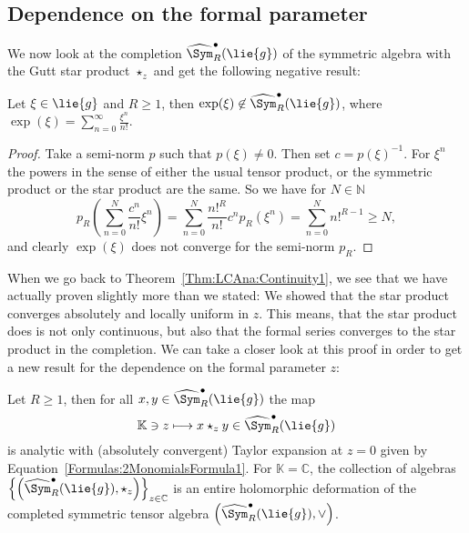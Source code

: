 \subsection{Dependence on the formal parameter}

We now look at the completion $\widehat{\Sym}_R^{\bullet}(\lie{g})$ of
the symmetric algebra with the Gutt star product $\star_z$ and 
get the following negative result:
\begin{proposition}
    \label{proposition:NoExponentialsSorry}%
    Let $\xi \in \lie{g}$ and $R \geq 1$, then $\exp(\xi) \not\in
    \widehat{\Sym}_R^{\bullet}(\lie{g})$, where $\exp(\xi) =
    \sum_{n=0}^{\infty} \frac{\xi^n}{n!}$.
\end{proposition}
\begin{proof}
    Take a semi-norm $p$ such that $p(\xi) \neq 0$. Then set $c =
    p(\xi)^{-1}$. For $\xi^n$ the powers in the sense of either the
    usual tensor product, or the symmetric product or the star product
    are the same. So we have for $N \in \mathbb{N}$
    \begin{equation*}
        p_R \left(
        \sum\limits_{n=0}^N
        \frac{c^n}{n!} \xi^n
        \right)
        =
        \sum\limits_{n=0}^N
        \frac{n!^R}{n!}
        c^n
        p_R \left( \xi^n
        \right)
        =
        \sum\limits_{n=0}^N
        n!^{R - 1}
        \geq
        N,
    \end{equation*}
    and clearly $\exp(\xi)$ does not converge for the semi-norm $p_R$.
\end{proof}
When we go back to Theorem~\ref{Thm:LCAna:Continuity1}, we see that we have 
actually proven slightly more than we stated: We showed that the star product 
converges absolutely and locally uniform in $z$. This means, that the star 
product does is not only continuous, but also that the formal series converges 
to the star product in the completion. We can take a closer look at this proof 
in order to get a new result for the dependence on the formal parameter $z$:
\begin{proposition}[Dependence on $z$]
    \label{corollary:HolomorphicDependence}%
    Let $R \geq 1$, then for all $x, y \in \widehat{\Sym}_R^\bullet(\lie{g})$ 
    the map
    \begin{equation}
        \label{LCAna:Holomorphicity}
        \mathbb{K} \ni z
        \longmapsto
        x \star_z y \in
        \widehat{\Sym}_R^\bullet(\lie{g})
    \end{equation}
    is analytic with (absolutely convergent) Taylor expansion at $z = 0$ 
    given by Equation~\eqref{Formulas:2MonomialsFormula1}. For 
    $\mathbb{K} = \mathbb{C}$, the collection of algebras $\left\{ \left( 
    \widehat{\Sym}_R^\bullet(\lie{g}), \star_z \right) \right\}_{z \in 
    \mathbb{C}}$ is an entire holomorphic deformation of the completed 
    symmetric tensor algebra $\left( \widehat{\Sym}_R^\bullet(\lie{g}), \vee 
    \right)$.
\end{proposition}
